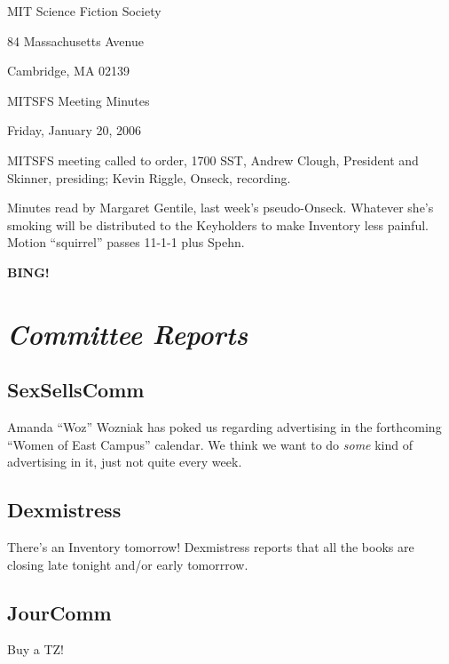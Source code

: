 \documentclass[10pt]{article}
\newcommand{\bing}{{\bf BING!} }
\newcommand{\goto}[1]{\bing \vskip 12pt \section*{{\em{#1}}}}
\newcommand{\ps}{ plus Spehn\xspace}
\begin{document}
\begin{center}

MIT Science Fiction Society

84 Massachusetts Avenue

Cambridge, MA 02139

\vspace{12pt}

MITSFS Meeting Minutes

Friday, January 20, 2006

\end{center}

\vspace{18pt}

\setlength{\parskip}{6pt}

\noindent
MITSFS meeting called to order, 1700 SST,
Andrew Clough, President and Skinner, presiding; Kevin Riggle, Onseck, recording.

Minutes read by Margaret Gentile, last week's pseudo-Onseck.  Whatever she's smoking will be 
distributed to the Keyholders to make Inventory less painful.  Motion ``squirrel'' passes 
11-1-1\ps.

\goto{Committee Reports}

\subsection*{SexSellsComm}
Amanda ``Woz'' Wozniak has poked us regarding advertising in the forthcoming ``Women of East 
Campus'' calendar.  We think we want to do \emph{some} kind of advertising in it, just not quite
every week.

\subsection*{Dexmistress}
There's an Inventory tomorrow!  Dexmistress reports that all the books are closing late tonight
and/or early tomorrrow.



\subsection*{JourComm}
Buy a TZ!
\end{document}

